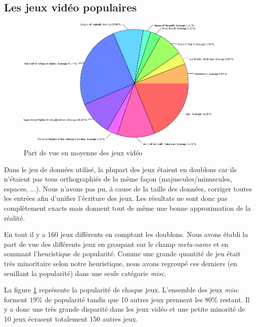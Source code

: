 \documentclass[11pt, a4paper, titlepage]{scrartcl}
\begin{document}
\subsection{Les jeux vidéo populaires}
\begin{figure}[h]
    \centering
    \includegraphics[width=\textwidth]{images/main_games}
    \caption{Part de vue en moyenne des jeux vidéo}
    \label{fig:main_games}
\end{figure}

Dans le jeu de données utilisé, la plupart des jeux étaient en doublons car ils
n'étaient pas tous orthographiés de la même façon (majuscules/minuscules,
espaces, ...). Nous n'avons pas pu, à cause de la taille des données, corriger
toutes les entrées afin d'unifier l'écriture des jeux. Les résultats ne sont
donc pas complètement exacts mais donnent tout de même une bonne approximation
de la réalité.

En tout il y a 160 jeux différents en comptant les doublons. Nous avons établi
la part de vue des différents jeux en groupant sur le champ \textit{meta-name}
et en sommant l'heuristique de popularité. Comme une grande quantité de jeu
était très minoritaire selon notre heuristique, nous avons regroupé ces
derniers (en seuillant la popularité) dans une seule catégorie \textit{misc}.

La figure \ref{fig:main_games} représente la popularité de chaque jeux.
L'ensemble des jeux \textit{misc} forment $19\%$ de popularité tandis que 10
autres jeux prennent les $80\%$ restant. Il y a donc une très grande disparité
dans les jeux vidéo et une petite minorité de 10 jeux écrasent totalement 150
autres jeux.
\end{document}
